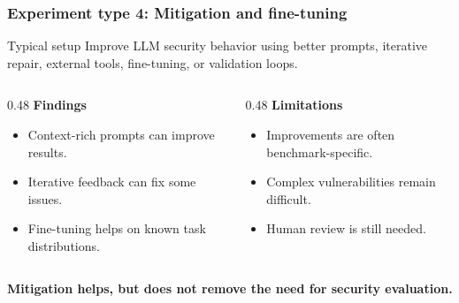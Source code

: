 \begin{frame}
\frametitle{Experiment type 4: Mitigation and fine-tuning}

\begin{block}{Typical setup}
Improve LLM security behavior using better prompts, iterative repair, external tools, fine-tuning, or validation loops.
\end{block}

\medskip

\begin{columns}[T]
\begin{column}{0.48\textwidth}
\textbf{Findings}
\begin{itemize}
    \item Context-rich prompts can improve results.
    \item Iterative feedback can fix some issues.
    \item Fine-tuning helps on known task distributions.
\end{itemize}
\end{column}

\begin{column}{0.48\textwidth}
\textbf{Limitations}
\begin{itemize}
    \item Improvements are often benchmark-specific.
    \item Complex vulnerabilities remain difficult.
    \item Human review is still needed.
\end{itemize}
\end{column}
\end{columns}

\bigskip
\centering
\textbf{Mitigation helps, but does not remove the need for security evaluation.}

\end{frame}


